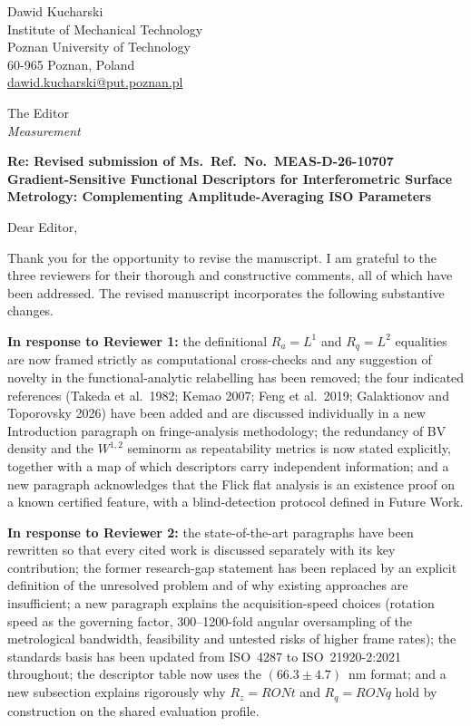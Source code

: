 \documentclass[11pt,a4paper]{article}
\begin{document}
\noindent
Dawid Kucharski\\
Institute of Mechanical Technology\\
Poznan University of Technology\\
60-965 Poznan, Poland\\
\href{mailto:dawid.kucharski@put.poznan.pl}{dawid.kucharski@put.poznan.pl}

\bigskip
\noindent
The Editor\\
\textit{Measurement}

\bigskip
\noindent
\textbf{Re: Revised submission of Ms.\ Ref.\ No.\ MEAS-D-26-10707}\\
\textbf{Gradient-Sensitive Functional Descriptors for Interferometric Surface Metrology: Complementing Amplitude-Averaging ISO Parameters}

\bigskip

Dear Editor,

Thank you for the opportunity to revise the manuscript. I am grateful to the three reviewers for their thorough and constructive comments, all of which have been addressed. The revised manuscript incorporates the following substantive changes.

\textbf{In response to Reviewer 1:} the definitional $R_a = L^1$ and $R_q = L^2$ equalities are now framed strictly as computational cross-checks and any suggestion of novelty in the functional-analytic relabelling has been removed; the four indicated references (Takeda et al.\ 1982; Kemao 2007; Feng et al.\ 2019; Galaktionov and Toporovsky 2026) have been added and are discussed individually in a new Introduction paragraph on fringe-analysis methodology; the redundancy of BV density and the $W^{1,2}$ seminorm as repeatability metrics is now stated explicitly, together with a map of which descriptors carry independent information; and a new paragraph acknowledges that the Flick flat analysis is an existence proof on a known certified feature, with a blind-detection protocol defined in Future Work.

\textbf{In response to Reviewer 2:} the state-of-the-art paragraphs have been rewritten so that every cited work is discussed separately with its key contribution; the former research-gap statement has been replaced by an explicit definition of the unresolved problem and of why existing approaches are insufficient; a new paragraph explains the acquisition-speed choices (rotation speed as the governing factor, 300--1200-fold angular oversampling of the metrological bandwidth, feasibility and untested risks of higher frame rates); the standards basis has been updated from ISO~4287 to ISO~21920-2:2021 throughout; the descriptor table now uses the $(66.3 \pm 4.7)$~nm format; and a new subsection explains rigorously why $R_z = RONt$ and $R_q = RONq$ hold by construction on the shared evaluation profile.
\end{document}
